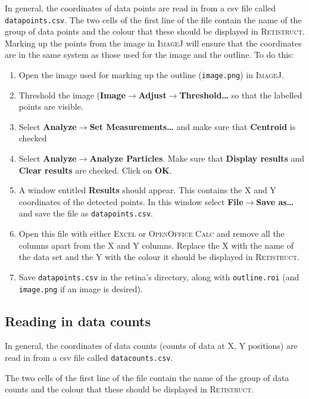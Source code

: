 \documentclass{book}
\begin{document}
In general, the coordinates of data points are read in from a csv file
called \texttt{datapoints.csv}. The two cells of the first line of the
file contain the name of the group of data points and the colour that
these should be displayed in \textsc{Retistruct}.  Marking up the
points from the image in \textsc{ImageJ} will ensure that the
coordinates are in the same system as those used for the image and the
outline. To do this:
\begin{enumerate}
\item Open the image used for marking up the outline
  (\texttt{image.png}) in \textsc{ImageJ}.
\item Threshold the image
  (\textbf{Image$\rightarrow$Adjust$\rightarrow$Threshold\dots} so
  that the labelled points are visible.
\item Select \textbf{Analyze$\rightarrow$Set Measurements\dots} and make
  sure that \textbf{Centroid} is checked
\item Select \textbf{Analyze$\rightarrow$Analyze Particles}. Make sure
  that \textbf{Display results} and \textbf{Clear results} are
  checked. Click on \textbf{OK}.
\item A window entitled \textbf{Results} should appear. This contains
  the X and Y coordinates of the detected points. In this window
  select \textbf{File$\rightarrow$Save as\dots} and save the file as
  \texttt{datapoints.csv}.
\item Open this file with either \textsc{Excel} or \textsc{OpenOffice
    Calc} and remove all the columns apart from the X and Y
  columns. Replace the X with the name of the data set and the Y with
  the colour it should be displayed in \textsc{Retistruct}.
\item Save \texttt{datapoints.csv} in the retina's directory, along
  with \texttt{outline.roi} (and \texttt{image.png} if an image is
  desired).
\end{enumerate}

\subsection{Reading in data counts}
\label{retistruct-user-guide:sec:read-data-counts}

In general, the coordinates of data counts (counts of data at X, Y
positions) are read in from a csv file called \texttt{datacounts.csv}.

The two cells of the first line of the file contain the name of the
group of data counts and the colour that these should be displayed in
\textsc{Retistruct}. 
\end{document}
